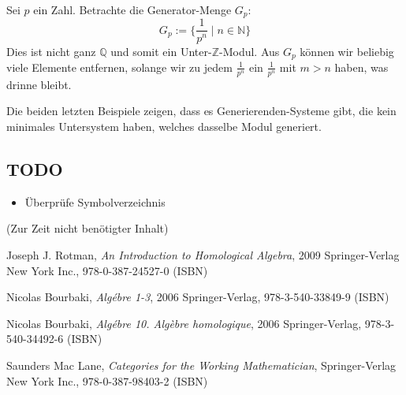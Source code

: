 \documentclass[a4paper]{amsart}
\theoremstyle{definition}
\newcommand{\Q}{\ensuremath{\mathbb{ Q }}}
\newcommand{\Z}{\ensuremath{\mathbb{ Z }}}
\newcommand{\N}{\ensuremath{\mathbb{ N }}}
\begin{document}
Sei $p$ ein Zahl. Betrachte die Generator-Menge $G_p$:
\begin{equation}\label{p}
   G_p := \{\frac{1}{p^n} \mid n \in \N \}
\end{equation}
Dies ist nicht ganz $\Q$ und somit ein Unter-$\Z$-Modul. Aus $G_p$ können wir beliebig viele Elemente entfernen, solange wir zu jedem $\frac{1}{p^n}$ ein $\frac{1}{p^n}$ mit $m > n$ haben, was drinne bleibt. 

Die beiden letzten Beispiele zeigen, dass es Generierenden-Systeme gibt, die kein minimales Untersystem haben, welches dasselbe Modul generiert.

\begin{backup}
\section{TODO}
\begin{itemize}
     \item Überprüfe Symbolverzeichnis
\end{itemize}


\end{backup}

\begin{backup}
    (Zur Zeit nicht benötigter Inhalt)
\end{backup}

\begin{thebibliography}{9}
   	Joseph J. Rotman, \emph{An Introduction to Homological Algebra},
   	2009 Springer-Verlag New York Inc., 978-0-387-24527-0 (ISBN)

      Nicolas Bourbaki, \emph{Algébre 1-3},
      2006 Springer-Verlag, 978-3-540-33849-9 (ISBN)

      Nicolas Bourbaki, \emph{Algébre 10. Algèbre homologique},
      2006 Springer-Verlag, 978-3-540-34492-6 (ISBN)

      Saunders Mac Lane, \emph{Categories for the Working Mathematician},
      Springer-Verlag New York Inc., 978-0-387-98403-2 (ISBN)

\end{thebibliography}
\end{document}
